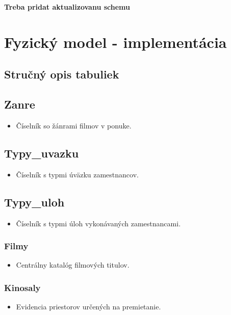 \documentclass[11pt, a4paper]{article}
\begin{document}
\textbf{Treba pridat aktualizovanu schemu}

\newpage

\section{Fyzický model - implementácia}
\label{sec:implementacia}

\subsection{Stručný opis tabuliek}

\subsection{Zanre}
\begin{itemize}
    \item Číselník so žánrami filmov v ponuke.
\end{itemize}

\subsection{Typy\_uvazku}
\begin{itemize}
    \item Číselník s typmi úväzku zamestnancov.
\end{itemize}

\subsection{Typy\_uloh}
\begin{itemize}
    \item Číselník s typmi úloh vykonávaných zamestnancami.
\end{itemize}

\subsubsection{Filmy}
\begin{itemize}
\item Centrálny katalóg filmových titulov.
\end{itemize}

\subsubsection{Kinosaly}
\begin{itemize}
    \item Evidencia priestorov určených na premietanie.
\end{itemize}
\end{document}
